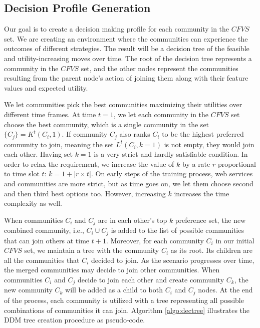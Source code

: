 \documentclass[11pt,onecolumn]{IEEEtran}
\begin{document}
\subsection{Decision Profile Generation}\label{ss:learningmodel}


Our goal is to create a decision making profile for each community in the
$CFVS$ set. We are creating an environment where the communities can experience the
outcomes of different strategies. The result will be a decision tree of the
feasible and utility-increasing moves over time. The root of the decision tree
represents a community in the $CFVS$ set, and the other nodes represent
the communities resulting from the parent node's action of joining them along with their feature values and
expected utility. 


We let communities pick the best communities maximizing their utilities over different time frames. At time $t = 1$, we let each community in the $CFVS$ set choose the best community, which is a single community in the set $\{C_j\} = K^t(C_i, 1)$. If community $C_j$ also ranks $C_i$ to be the highest preferred community to join, meaning the set $L^t(C_i, k=1)$ is not empty, they would join each other. Having set $k = 1$ is a very strict and hardly satisfiable condition. In order to relax the requirement, we increase the value of $k$ by a rate $r$ proportional to time slot $t$: $k = 1 + |r \times t|$. On early steps of the training process, web services and communities are more strict, but as time goes on, we let them choose second and then third best options too. However, increasing $k$  increases the time complexity as well.  

When communities $C_i$ and $C_j$ are in each other's top $k$ preference set, the new combined community, i.e., $C_i \cup C_j$ is added to the list of possible communities that can join others at time $t+1$. Moreover, for each community $C_i$ in our initial $CFVS$ set, we maintain a tree with the community $C_i$ as its root. Its children are all the communities that $C_i$ decided to join. As the scenario progresses over time, the merged communities may decide to join other communities. When communities $C_i$ and $C_j$ decide to join each other and create community $C_k$, the new community $C_k$ will be added as a child to both $C_i$ and $C_j$ nodes. At the end of the process, each community is utilized with a tree representing all possible combinations of communities it can join. Algorithm \ref{algo:dectree} illustrates the DDM tree creation procedure as pseudo-code.
\end{document}
